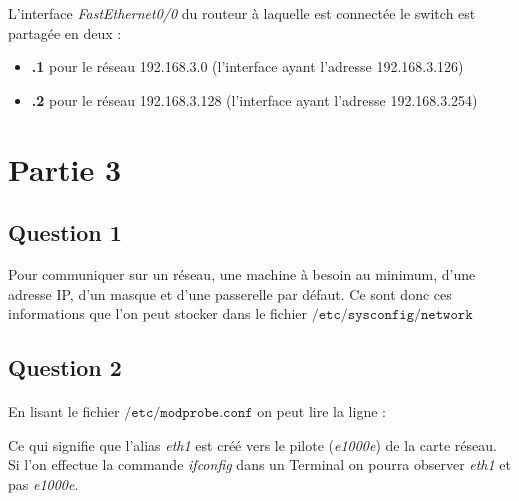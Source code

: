 \documentclass[a4paper,12pt]{article}
\begin{document}
L'interface \textit{FastEthernet0/0} du routeur à laquelle est connectée le switch est partagée en deux :
\begin{itemize}
\item \textbf{.1} pour le réseau 192.168.3.0 (l'interface ayant l'adresse 192.168.3.126)
\item \textbf{.2 }pour le réseau 192.168.3.128 (l'interface ayant l'adresse 192.168.3.254)
\end{itemize}


\section{Partie 3}
\subsection{Question 1}
Pour communiquer sur un réseau, une machine à besoin au minimum, d'une adresse IP, d'un masque et d'une passerelle par défaut. Ce sont donc ces informations que l'on peut stocker dans le fichier $\mathtt{/etc/sysconfig/network}$

\begin{center}
 \end{center}

\subsection{Question 2}
\paragraph{}En lisant le fichier $\mathtt{/etc/modprobe.conf}$ on peut lire la ligne :

\begin{center}
 \end{center}

Ce qui signifie que l'alias \textit{eth1} est créé vers le pilote (\textit{e1000e}) de la carte réseau. Si l'on effectue la commande \textit{ifconfig} dans un Terminal on pourra observer \textit{eth1} et pas \textit{e1000e}.
\end{document}
